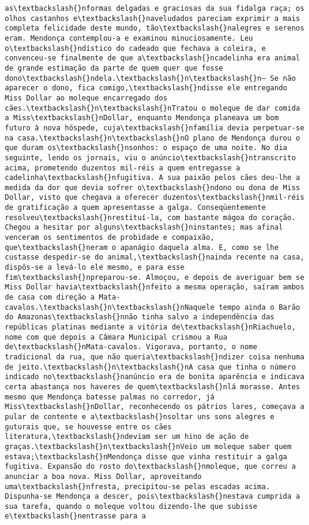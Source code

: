 \documentclass[11pt]{article}
\begin{document}
\begin{Verbatim}[commandchars=\\\{\}]
as\textbackslash{}nformas delgadas e graciosas da sua fidalga raça; os olhos castanhos e\textbackslash{}naveludados pareciam exprimir a mais completa felicidade deste mundo, tão\textbackslash{}nalegres e serenos eram. Mendonça contemplou-a e examinou minuciosamente. Leu o\textbackslash{}ndístico do cadeado que fechava a coleira, e convenceu-se finalmente de que a\textbackslash{}ncadelinha era animal de grande estimação da parte de quem quer que fosse dono\textbackslash{}ndela.\textbackslash{}n\textbackslash{}n— Se não aparecer o dono, fica comigo,\textbackslash{}ndisse ele entregando Miss Dollar ao moleque encarregado dos cães.\textbackslash{}n\textbackslash{}nTratou o moleque de dar comida a Miss\textbackslash{}nDollar, enquanto Mendonça planeava um bom futuro à nova hóspede, cuja\textbackslash{}nfamília devia perpetuar-se na casa.\textbackslash{}n\textbackslash{}nO plano de Mendonça durou o que duram os\textbackslash{}nsonhos: o espaço de uma noite. No dia seguinte, lendo os jornais, viu o anúncio\textbackslash{}ntranscrito acima, prometendo duzentos mil-réis a quem entregasse a cadelinha\textbackslash{}nfugitiva. A sua paixão pelos cães deu-lhe a medida da dor que devia sofrer o\textbackslash{}ndono ou dona de Miss Dollar, visto que chegava a oferecer duzentos\textbackslash{}nmil-réis de gratificação a quem apresentasse a galga. Conseqüentemente resolveu\textbackslash{}nrestituí-la, com bastante mágoa do coração. Chegou a hesitar por alguns\textbackslash{}ninstantes; mas afinal venceram os sentimentos de probidade e compaixão, que\textbackslash{}neram o apanágio daquela alma. E, como se lhe custasse despedir-se do animal,\textbackslash{}nainda recente na casa, dispôs-se a levá-lo ele mesmo, e para esse fim\textbackslash{}npreparou-se. Almoçou, e depois de averiguar bem se Miss Dollar havia\textbackslash{}nfeito a mesma operação, saíram ambos de casa com direção a Mata-cavalos.\textbackslash{}n\textbackslash{}nNaquele tempo ainda o Barão do Amazonas\textbackslash{}nnão tinha salvo a independência das repúblicas platinas mediante a vitória de\textbackslash{}nRiachuelo, nome com que depois a Câmara Municipal crismou a Rua de\textbackslash{}nMata-cavalos. Vigorava, portanto, o nome tradicional da rua, que não queria\textbackslash{}ndizer coisa nenhuma de jeito.\textbackslash{}n\textbackslash{}nA casa que tinha o número indicado no\textbackslash{}nanúncio era de bonita aparência e indicava certa abastança nos haveres de quem\textbackslash{}nlá morasse. Antes mesmo que Mendonça batesse palmas no corredor, já Miss\textbackslash{}nDollar, reconhecendo os pátrios lares, começava a pular de contente e a\textbackslash{}nsoltar uns sons alegres e guturais que, se houvesse entre os cães literatura,\textbackslash{}ndeviam ser um hino de ação de graças.\textbackslash{}n\textbackslash{}nVeio um moleque saber quem estava;\textbackslash{}nMendonça disse que vinha restituir a galga fugitiva. Expansão do rosto do\textbackslash{}nmoleque, que correu a anunciar a boa nova. Miss Dollar, aproveitando uma\textbackslash{}nfresta, precipitou-se pelas escadas acima. Dispunha-se Mendonça a descer, pois\textbackslash{}nestava cumprida a sua tarefa, quando o moleque voltou dizendo-lhe que subisse e\textbackslash{}nentrasse para a 
\end{Verbatim}
\end{document}
